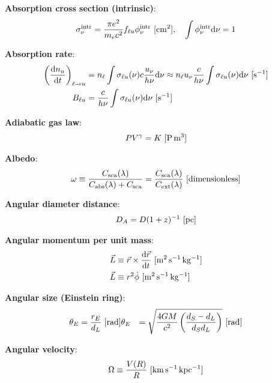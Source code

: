 \documentclass[a4paper,10pt]{article}
\begin{document}
{\noindent}\textbf{Absorption cross section (intrinsic)}:
\begin{align*}
    \sigma_\nu^{\rm intr} = \frac{\pi e^2}{m_ec^2}f_{\ell u} \phi_\nu^{\rm intr} ~ [{\rm cm^2}], ~~~ \int\phi_\nu^{\rm intr}{\rm d}\nu =1
\end{align*}

{\noindent}\textbf{Absorption rate}:
\begin{align*}
    \left(\frac{{\rm d}n_u}{{\rm d}t}\right)_{\ell\rightarrow u} &= n_\ell \int \sigma_{\ell u}(\nu)c \frac{u_\nu}{h\nu}{\rm d}\nu \approx n_\ell u_\nu \frac{c}{h\nu} \int \sigma_{\ell u}(\nu){\rm d}\nu ~ [{\rm s^{-1}}] \\
     B_{\ell u} &= \frac{c}{h\nu} \int \sigma_{\ell u}(\nu){\rm d}\nu ~ [{\rm s^{-1}}]
\end{align*}

{\noindent}\textbf{Adiabatic gas law}:
\begin{align*}
    PV^\gamma = K ~ [{\rm P\,m^3}]
\end{align*}

{\noindent}\textbf{Albedo}:
\begin{align*}
    \omega \equiv \frac{C_{\rm sca}(\lambda)}{C_{\rm abs}(\lambda)+C_{\rm sca}} = \frac{C_{\rm sca}(\lambda)}{C_{\rm ext}(\lambda)} ~ [{\rm dimensionless}]
\end{align*}

{\noindent}\textbf{Angular diameter distance}:
\begin{align*}
    D_A = D(1+z)^{-1} ~ [{\rm pc}]
\end{align*}

{\noindent}\textbf{Angular momentum per unit mass}:
\begin{align*}
    \vec{L}&\equiv\vec{r}\times\frac{{\rm d}\vec{r}}{{\rm d}t} ~ [{\rm m^2\,s^{-1}\,kg^{-1}}] \\
    \vec{L}&\equiv r^2\dot{\phi} ~ [{\rm m^2\,s^{-1}\,kg^{-1}}]
\end{align*}

{\noindent}\textbf{Angular size (Einstein ring)}:
\begin{align*}
    \theta_E &= \frac{r_E}{d_L} ~ [{\rm rad}]
    \theta_E &= \sqrt{\frac{4GM}{c^2} \left(\frac{d_S-d_L}{d_Sd_L}\right)} ~ [{\rm rad}]
\end{align*}

{\noindent}\textbf{Angular velocity}:
\begin{align*}
    \Omega \equiv \frac{V(R)}{R} ~ [{\rm km\,s^{-1}\,kpc^{-1}}]
\end{align*}
\end{document}
